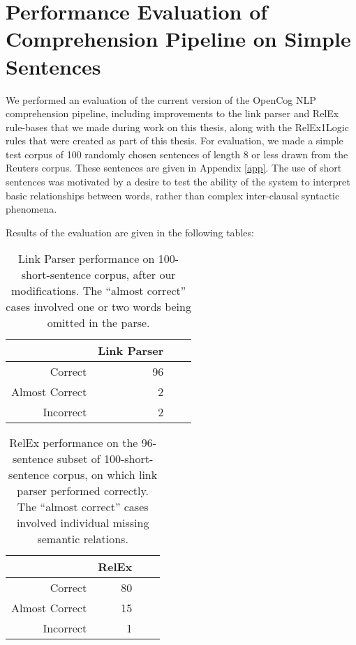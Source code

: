 \documentclass[11pt]{article}
\begin{document}
\section{Performance Evaluation of Comprehension Pipeline on Simple Sentences}

We performed an evaluation of the current version of the OpenCog NLP comprehension pipeline, including improvements to the link parser and RelEx rule-bases that we made during work on this thesis, along with the RelEx1Logic rules that were created as part of this thesis.   For evaluation, we made a simple test corpus of 100 randomly chosen sentences of length 8 or less drawn from the Reuters corpus.  These sentences are given in Appendix \ref{app}.   The use of short sentences was motivated by a desire to test the ability of the system to interpret basic relationships between words, rather than complex inter-clausal syntactic phenomena.

Results of the evaluation are given in the following tables:

\FloatBarrier

\begin{table}
\center
\begin{tabular}{|r|r|r||c|}
\hline
 & Link Parser\\
\hline
Correct & 96   \\
Almost Correct & 2    \\
Incorrect & 2       \\

\hline
\end{tabular}
\caption{Link Parser performance on 100-short-sentence corpus, after our modifications.  The ``almost correct'' cases involved one or two words being omitted in the parse.}
\label{table:settings}
\end{table}


\begin{table}
\center
\begin{tabular}{|r|r|r||c|}
\hline
 & RelEx\\
\hline
Correct & 80    \\
Almost Correct & 15     \\
Incorrect & 1     \\

\hline
\end{tabular}
\caption{RelEx performance on the 96-sentence subset of 100-short-sentence corpus, on which link parser performed correctly.   The ``almost correct'' cases involved individual missing semantic relations.}
\label{table:settings}
\end{table}
\end{document}
